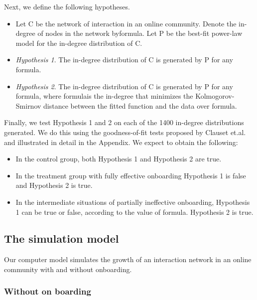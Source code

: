 Next, we define the following hypotheses. 

\begin{itemize}
\item Let C be the network of interaction in an online community. Denote the in-degree of nodes in the network byformula. Let P be the best-fit power-law model for the in-degree distribution of C.
\item \emph{Hypothesis 1}. The in-degree distribution of C is generated by P for any formula.
\item \emph{Hypothesis 2}. The in-degree distribution of C is generated by P for any formula, where formulais the in-degree that minimizes the Kolmogorov-Smirnov distance between the fitted function and the data over formula.
\end{itemize}

Finally, we test Hypothesis 1 and 2 on each of the 1400 in-degree distributions generated. We do this using the goodness-of-fit tests proposed by Clauset et.al. \cite{clauset2009power} and illustrated in detail in the Appendix.
We expect to obtain the following:

\begin{itemize}
\item In the control group, both Hypothesis 1 and Hypothesis 2 are true. 
\item In the treatment group with fully effective onboarding Hypothesis 1 is false and Hypothesis 2 is true. 
\item In the intermediate situations of partially ineffective onboarding, Hypothesis 1 can be true or false, according to the value of formula. Hypothesis 2 is true.
\end{itemize}


\subsection{The simulation model}

Our computer model simulates the growth of an interaction network in an online community with and without onboarding.  

\subsubsection*{Without on boarding}

